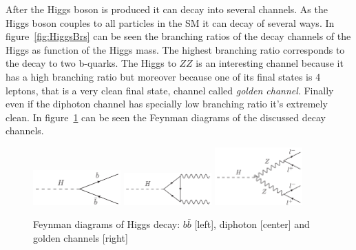 After the Higgs boson is produced it can decay into several channels. As the Higgs boson couples to all particles in the SM it can decay of several ways. In figure~\ref{fig:HiggsBrs} can be seen the branching ratios of the decay channels of the Higgs as function of the Higgs mass. The highest branching ratio corresponds to the decay to two b-quarks. The Higgs to $ZZ$ is an interesting channel because it has a high branching ratio but moreover because one of its final states is 4 leptons, that is a very clean final state, channel called \textit{golden channel}. Finally even if the diphoton channel has specially low branching ratio it's extremely clean. In figure~\ref{fig:HiggsDecays} can be seen the Feynman diagrams of the discussed decay channels.

\begin{figure}[!Hhtbp]
  \begin{center}
    \includegraphics[width=0.3\textwidth]{figs/BB_H.png}
    \includegraphics[width=0.3\textwidth]{figs/Diphoton_H.png}
    \includegraphics[width=0.3\textwidth]{figs/Golden_H.png}
    \caption{Feynman diagrams of Higgs decay: $b\bar{b}$ [left], diphoton [center] and golden channels [right]}
    \label{fig:HiggsDecays}
  \end{center}
\end{figure}

